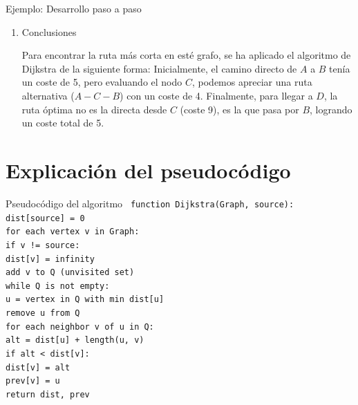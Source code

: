 \documentclass{beamer}
\begin{document}
    \begin{frame}{Ejemplo: Desarrollo paso a paso}
        \begin{enumerate}
            \item[4.] Conclusiones

            \vspace{0.25cm}

            Para encontrar la ruta más corta en esté grafo, se ha aplicado el algoritmo de Dijkstra de la siguiente forma: Inicialmente, el camino directo de $A$ a $B$ tenía un coste de 5, pero evaluando el nodo $C$, podemos apreciar una ruta alternativa ($A-C-B$) con un coste de 4. Finalmente, para llegar a $D$, la ruta óptima no es la directa desde $C$ (coste 9), es la que pasa por $B$, logrando un coste total de 5.
        \end{enumerate}
    \end{frame}

    \section{Explicación del pseudocódigo}


    \begin{frame}{Pseudocódigo del algoritmo}
        \texttt{
            \noindent function Dijkstra(Graph, source):\\
            \qquad dist[source] = 0 \\
            \qquad for each vertex v in Graph: \\
            \qquad  \qquad if v != source: \\
            \qquad \qquad \qquad dist[v] = infinity \\ 
            \qquad  \qquad add v to Q (unvisited set) \\ 
            \qquad while Q is not empty: \\
            \qquad \qquad u = vertex in Q with min dist[u] \\ 
            \qquad \qquad remove u from Q \\ 
            \qquad \qquad for each neighbor v of u in Q: \\
            \qquad \qquad \qquad alt = dist[u] + length(u, v) \\ 
            \qquad \qquad \qquad if alt < dist[v]: \\
            \qquad \qquad \qquad \qquad dist[v] = alt \\
            \qquad \qquad \qquad \qquad prev[v] = u \\
            \qquad return dist, prev
        }
    \end{frame}
\end{document}
